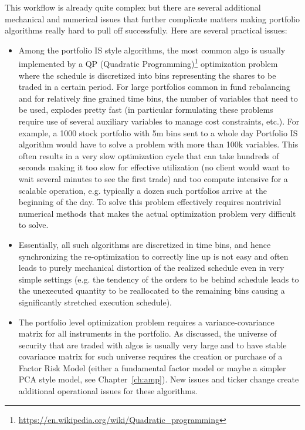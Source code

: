 This workflow is already quite complex but there are several additional mechanical and numerical issues that further complicate matters making portfolio algorithms really hard to pull off successfully. Here are several practical issues:
\begin{itemize}
\item Among the portfolio IS style algorithms, the most common algo is usually implemented by a QP (Quadratic Programming)\footnote{\url{https://en.wikipedia.org/wiki/Quadratic_programming}} optimization problem where the schedule is discretized into bins representing the shares to be traded in a certain period. For large portfolios common in fund rebalancing and for relatively fine grained time bins, the number of variables that need to be used, explodes pretty fast (in particular formulating these problems require use of several auxiliary variables to manage cost constraints, etc.). For example, a 1000 stock portfolio with 5m bins  sent to a whole day Portfolio IS algorithm would have to solve a problem with more than 100k variables. This often results in a very slow  optimization cycle that can take hundreds of seconds making it too slow for effective utilization (no client would want to wait several minutes to see the first trade) and too compute intensive for a scalable operation, e.g. typically a dozen such portfolios arrive at the beginning of the day. To solve this problem effectively requires nontrivial numerical methods that makes the actual optimization problem very difficult to solve.

\item Essentially, all such algorithms are discretized in time bins, and hence synchronizing the re-optimization to correctly line up is not easy and often leads to purely mechanical distortion of the realized schedule even in very simple settings (e.g. the tendency of the orders to be behind schedule leads to the unexecuted quantity to be reallocated to the remaining bins causing a significantly stretched execution schedule).

\item The portfolio level optimization problem requires a variance-covariance matrix for all instruments in the portfolio. As discussed, the universe of security that are traded with algos is usually very large and to have stable covariance matrix for such universe requires the creation or purchase of a Factor Risk Model (either a fundamental factor model or maybe a simpler PCA style model, see Chapter~\ref{ch:amp}). New issues and ticker change create additional operational issues for these algorithms.


\end{itemize}

